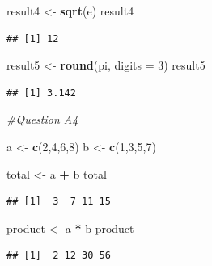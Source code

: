 \documentclass[
]{article}
\newenvironment{Shaded}{\begin{snugshade}}{\end{snugshade}}
\newcommand{\AttributeTok}[1]{\textcolor[rgb]{0.13,0.29,0.53}{#1}}
\newcommand{\CommentTok}[1]{\textcolor[rgb]{0.56,0.35,0.01}{\textit{#1}}}
\newcommand{\DecValTok}[1]{\textcolor[rgb]{0.00,0.00,0.81}{#1}}
\newcommand{\FunctionTok}[1]{\textcolor[rgb]{0.13,0.29,0.53}{\textbf{#1}}}
\newcommand{\NormalTok}[1]{#1}
\newcommand{\OtherTok}[1]{\textcolor[rgb]{0.56,0.35,0.01}{#1}}
\newcommand{\SpecialCharTok}[1]{\textcolor[rgb]{0.81,0.36,0.00}{\textbf{#1}}}
\begin{document}
\begin{Shaded}
\begin{Highlighting}[]
\NormalTok{result4 }\OtherTok{\textless{}{-}} \FunctionTok{sqrt}\NormalTok{(e)}
\NormalTok{result4}
\end{Highlighting}
\end{Shaded}

\begin{verbatim}
## [1] 12
\end{verbatim}

\begin{Shaded}
\begin{Highlighting}[]
\NormalTok{result5 }\OtherTok{\textless{}{-}} \FunctionTok{round}\NormalTok{(pi, }\AttributeTok{digits =} \DecValTok{3}\NormalTok{)}
\NormalTok{result5}
\end{Highlighting}
\end{Shaded}

\begin{verbatim}
## [1] 3.142
\end{verbatim}

\begin{Shaded}
\begin{Highlighting}[]
\CommentTok{\#Question A4}

\NormalTok{a }\OtherTok{\textless{}{-}} \FunctionTok{c}\NormalTok{(}\DecValTok{2}\NormalTok{,}\DecValTok{4}\NormalTok{,}\DecValTok{6}\NormalTok{,}\DecValTok{8}\NormalTok{)}
\NormalTok{b }\OtherTok{\textless{}{-}} \FunctionTok{c}\NormalTok{(}\DecValTok{1}\NormalTok{,}\DecValTok{3}\NormalTok{,}\DecValTok{5}\NormalTok{,}\DecValTok{7}\NormalTok{)}

\NormalTok{total }\OtherTok{\textless{}{-}}\NormalTok{ a }\SpecialCharTok{+}\NormalTok{ b}
\NormalTok{total}
\end{Highlighting}
\end{Shaded}

\begin{verbatim}
## [1]  3  7 11 15
\end{verbatim}

\begin{Shaded}
\begin{Highlighting}[]
\NormalTok{product }\OtherTok{\textless{}{-}}\NormalTok{ a }\SpecialCharTok{*}\NormalTok{ b}
\NormalTok{product}
\end{Highlighting}
\end{Shaded}

\begin{verbatim}
## [1]  2 12 30 56
\end{verbatim}
\end{document}
